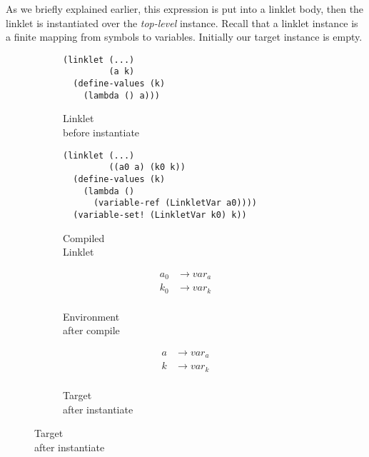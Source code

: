 As we briefly explained earlier, this expression is put into a linklet
body, then the linklet is instantiated over the \emph{top-level}
instance. Recall that a linklet instance is a finite mapping from
symbols to variables. Initially our target instance is empty.

\begin{figure}[h!]
  \small
  \begin{subfigure}[b]{0.25\textwidth}
    \begin{mdframed}
\begin{verbatim}
(linklet (...)
         (a k)
  (define-values (k)
    (lambda () a)))
\end{verbatim}
    \end{mdframed}
    \caption{Linklet \\ before instantiate}
    \label{fig:1}
  \end{subfigure}
  \begin{subfigure}[b]{0.38\textwidth}
    \begin{mdframed}
\begin{verbatim}
(linklet (...)
         ((a0 a) (k0 k))
  (define-values (k)
    (lambda ()
      (variable-ref (LinkletVar a0))))
  (variable-set! (LinkletVar k0) k))
\end{verbatim}
    \end{mdframed}
    \caption{Compiled \\ Linklet}
    \label{fig:2}
  \end{subfigure} \hfill
  \begin{subfigure}[b]{0.15\textwidth}
    \begin{mdframed}
      \begin{align*}
        a_0 &\rightarrow var_a \\
        k_0 &\rightarrow var_k \\
      \end{align*}
    \end{mdframed}
    \caption{Environment \\ after compile}
    \label{fig:2}
  \end{subfigure}
  \begin{subfigure}[b]{0.15\textwidth}
    \begin{mdframed}
      \begin{align*}
        a &\rightarrow var_a \\
        k &\rightarrow var_k \\
      \end{align*}
    \end{mdframed}
    \caption{Target \\ after instantiate}
    \label{fig:2}
  \end{subfigure}
\end{figure}

